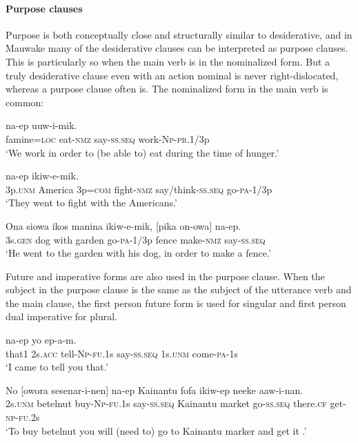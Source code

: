 \paragraph[Purpose clauses]{Purpose clauses} \label{sec:8.3.2.1.4}

Purpose is both conceptually close and structurally similar to desiderative, and in Mauwake many of the desiderative clauses can be interpreted as purpose clauses. This is particularly so when the main verb is in the nominalized form. But a truly desiderative clause even with an action nominal is never right-dislocated, whereas a purpose clause  often is. The nominalized form in the main verb is common:

\ea%
\label{ex:8:x371}
\gll [Weniwa=pa  en-owa]  na-ep  uuw-i-mik. \\
famine=\textsc{loc} eat-\textsc{nmz} say-\textsc{ss}.\textsc{seq} work-\textsc{Np}-\textsc{pr}.1/3p\\
\glt`We work in order to (be able to) eat during the time of hunger.'
\z


\ea%
\label{ex:8:x345}
\gll [Wi  Amerika  wiam=iya  irak-owa]  na-ep  ikiw-e-mik.\\
3p.\textsc{unm} America  3p=\textsc{com} fight-\textsc{nmz} say/think-\textsc{ss}.\textsc{seq} go-\textsc{pa}-1/3p\\
\glt`They went to fight with the Americans.'
\z


\ea%
\label{ex:8:x372}
\gll Ona  siowa  ikos  manina  ikiw-e-mik, [pika  on-owa] na-ep.\\
3s.\textsc{gen} dog  with  garden  go-\textsc{pa}-1/3p  fence  make-\textsc{nmz} say-\textsc{ss}.\textsc{seq}\\
\glt`He went to the garden with his dog, in order to make a fence.'
\z


Future and imperative forms are also used in the purpose clause. When the subject in the purpose clause is the same as the subject of the utterance verb and the main clause, the first person future form is used for singular and first person dual imperative for plural.

\ea%
\label{ex:8:x1614}
  na-ep  yo  ep-a-m.\\
that1 2s.\textsc{acc} tell-\textsc{Np}-\textsc{fu}.1s  say-\textsc{ss}.\textsc{seq} 1s.\textsc{unm} come-\textsc{pa}-1s\\
\glt`I came to tell you that.'
\z


\ea%
\label{ex:8:x1616}
\gll No  [owora  sesenar-i-nen]  na-ep  Kainantu  fofa ikiw-ep  neeke  aaw-i-nan.\\
2s.\textsc{unm} betelnut  buy-\textsc{Np}-\textsc{fu}.1s say-\textsc{ss}.\textsc{seq} Kainantu  market go-\textsc{ss}.\textsc{seq} there.\textsc{cf} get-\textsc{np}-\textsc{fu}.2s\\
\glt`To buy betelnut you will (need to) go to Kainantu marker and get it .'
\z


